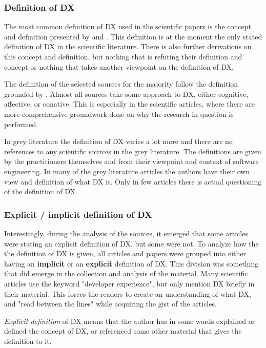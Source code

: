 \documentclass[english, 12pt, a4paper, sci, utf8, a-1b, online]{aaltothesis}
\begin{document}
\subsubsection{Definition of DX}

The most common definition of DX used in the scientific papers is the concept and definition presented by \cite{fagerholm-dx-concept-and-definition} and \cite{fagerholm-doctoral-thesis}. This definition is at the moment the only stated definition of DX in the scientific literature. There is also further derivations on this concept and definition, but nothing that is refuting their definition and concept or nothing that takes another viewpoint on the definition of DX.

The definition of the selected sources for the majority follow the definition grounded by \cite{fagerholm-doctoral-thesis}. Almost all sources take some approach to DX, either cognitive, affective, or conative. This is especially in the scientific articles, where there are more comprehensive groundwork done on why the research in question is performed.

In grey literature the definition of DX varies a lot more and there are no references to any scientific sources in the grey literature. The definitions are given by the practitioners themselves and from their viewpoint and context of software engineering. In many of the grey literature articles the authors have their own view and definition of what DX is. Only in few articles there is actual questioning of the definition of DX.

\subsubsection{Explicit / implicit definition of DX}

Interestingly, during the analysis of the sources, it emerged that some articles were stating an explicit definition of DX, but some were not. To analyze how the the definition of DX is given, all articles and papers were grouped into either having an \textbf{implicit} or an \textbf{explicit} definition of DX. This division was something that did emerge in the collection and analysis of the material. Many scientific articles use the keyword "developer experience", but only mention DX briefly in their material. This forces the readers to create an understanding of what DX, and "read between the lines" while acquiring the gist of the articles.

\textit{Explicit definition} of DX means that the author has in some words explained or defined the concept of DX, or referenced some other material that gives the definition to it.
\end{document}
